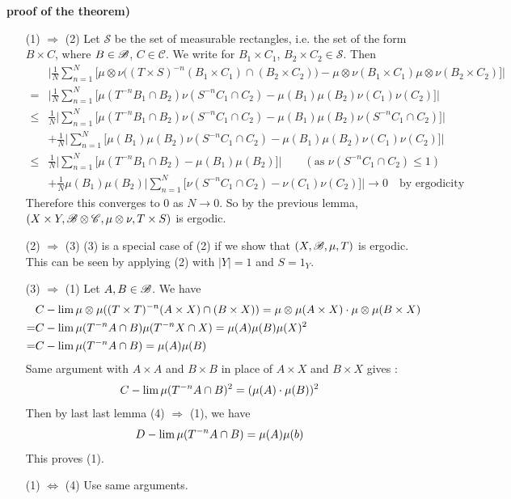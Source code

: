 \documentclass[10pt,a4paper]{report}
\newenvironment{proof}
{\begin{changemargin}{1cm}{0.5cm} 
	}%
	{\end{changemargin}
}
\begin{document}
\begin{proof}
\textbf{proof of the theorem)}
\begin{itemize}
\item[(1) $\Rightarrow$ (2)] Let $\mathscr{S}$ be the set of measurable rectangles, i.e. the set of the form $B\times C$, where $B\in \mathscr{B}$, $C\in \mathscr{C}$. We write for $B_1 \times C_1$, $B_2\times C_2 \in \mathscr{S}$. Then
\begin{align*}
& \Big| \frac{1}{N}\sum_{n=1}^N \Big[ \mu \otimes \nu \big((T\times S)^{-n}(B_1 \times C_1) \cap (B_2 \times C_2) \big) - \mu \otimes \nu (B_1 \times C_1)\mu \otimes \nu (B_2 \times C_2) \Big] \Big| \\
=& \Big| \frac{1}{N} \sum_{n=1}^N \Big[ \mu(T^{-n}B_1 \cap B_2) \nu(S^{-n}C_1 \cap C_2) - \mu(B_1) \mu(B_2) \nu(C_1) \nu(C_2) \Big] \Big| \\
\leq & \frac{1}{N} \Big| \sum_{n=1}^N \Big[ \mu(T^{-n}B_1 \cap B_2) \nu(S^{-n}C_1 \cap C_2) - \mu(B_1)\mu(B_2)\nu(S^{-n}C_1\cap C_2) \Big] \Big| \\
& + \frac{1}{N} \Big| \sum_{n=1}^N \Big[ \mu(B_1)\mu(B_2)\nu(S^{-n}C_1\cap C_2) - \mu(B_1) \mu(B_2) \nu(C_1) \nu(C_2) \Big] \Big| \\
\leq & \frac{1}{N} \Big| \sum_{n=1}^N \Big[ \mu(T^{-n}B_1 \cap B_2) - \mu(B_1)\mu(B_2)\Big] \Big| \quad\quad (\text{as } \nu(S^{-n}C_1\cap C_2) \leq 1 ) \\
& + \frac{1}{N} \mu(B_1) \mu(B_2) \Big| \sum_{n=1}^N \Big[ \nu(S^{-n}C_1 \cap C_2) - \nu(C_1)\nu(C_2) \Big] \Big| \rightarrow 0 \quad \text{by ergodicity}
\end{align*}
Therefore this converges to 0 as $N\rightarrow 0$. So by the previous lemma, $(X\times Y,\mathscr{B}\otimes \mathscr{C}, \mu\otimes \nu, T\times S)$ is ergodic.
\item[(2) $\Rightarrow$ (3)] (3) is a special case of (2) if we show that $(X,\mathscr{B}, \mu, T)$ is ergodic. This can be seen by applying (2) with $|Y|=1$ and $S = 1_{Y}$.
\item[(3) $\Rightarrow$ (1)]  Let $A,B \in \mathscr{B}$. We have
\begin{align*}
& C-\lim \mu \otimes \mu((T\times T)^{-n}(A\times X) \cap (B\times X)) = \mu \otimes \mu (A \times X) \cdot \mu \otimes \mu (B \times X) \\
=& C-\lim \mu(T^{-n}A\cap B)\mu(T^{-n}X\cap X) = \mu(A) \mu(B) \mu(X)^2 \\
=& C-\lim \mu(T^{-n}A\cap B) = \mu(A) \mu(B)
\end{align*}
Same argument with $A \times A$ and $B\times B$ in place of $A\times X$ and $B\times X$ gives :
\begin{align*}
C-\lim \mu(T^{-n}A \cap B)^2 = (\mu(A) \cdot \mu(B))^2
\end{align*}
Then by last last lemma (4) $\Rightarrow$ (1), we have
\begin{align*}
D-\lim \mu(T^{-n} A\cap B)= \mu(A) \mu(b)
\end{align*}
This proves (1).
\item[(1) $\Leftrightarrow$ (4)] Use same arguments.
\end{itemize}
\end{proof}
\s
\end{document}

